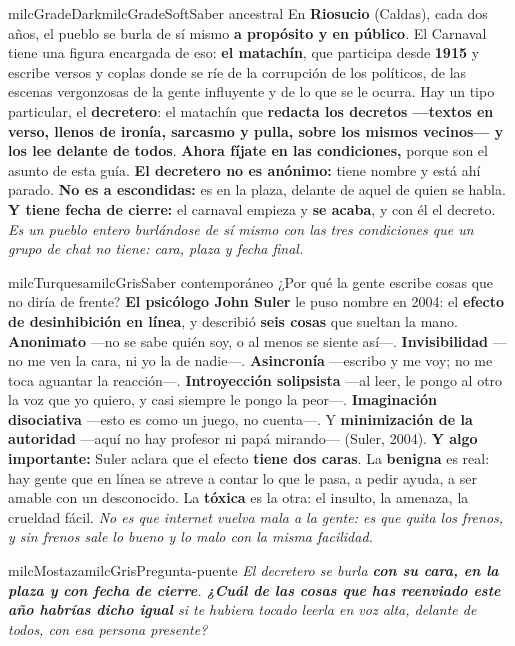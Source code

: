 \documentclass[11pt,letterpaper]{article}
\begin{document}
\begin{softbox}{milcGradeDark}{milcGradeSoft}{Saber ancestral}
En \textbf{Riosucio} (Caldas), cada dos años, el pueblo se burla de sí mismo \textbf{a propósito y en público}. El Carnaval tiene una figura encargada de eso: \textbf{el matachín}, que participa desde \textbf{1915} y escribe versos y coplas donde se ríe de la corrupción de los políticos, de las escenas vergonzosas de la gente influyente y de lo que se le ocurra. Hay un tipo particular, el \textbf{decretero}: el matachín que \textbf{redacta los decretos ---textos en verso, llenos de ironía, sarcasmo y pulla, sobre los mismos vecinos--- y \textbf{los lee delante de todos}}. \textbf{Ahora fíjate en las condiciones,} porque son el asunto de esta guía. \textbf{El decretero no es anónimo:} tiene nombre y está ahí parado. \textbf{No es a escondidas:} es en la plaza, delante de aquel de quien se habla. \textbf{Y tiene fecha de cierre:} el carnaval empieza y \textbf{se acaba}, y con él el decreto. \emph{Es un pueblo entero burlándose de sí mismo con las tres condiciones que un grupo de chat no tiene: cara, plaza y fecha final.}
\end{softbox}

\begin{softbox}{milcTurquesa}{milcGris}{Saber contemporáneo}
¿Por qué la gente escribe cosas que no diría de frente? \textbf{El psicólogo John Suler} le puso nombre en 2004: el \textbf{efecto de desinhibición en línea}, y describió \textbf{seis cosas} que sueltan la mano. \textbf{Anonimato} ---no se sabe quién soy, o al menos se siente así---. \textbf{Invisibilidad} ---no me ven la cara, ni yo la de nadie---. \textbf{Asincronía} ---escribo y me voy; no me toca aguantar la reacción---. \textbf{Introyección solipsista} ---al leer, le pongo al otro la voz que yo quiero, y casi siempre le pongo la peor---. \textbf{Imaginación disociativa} ---esto es como un juego, no cuenta---. Y \textbf{minimización de la autoridad} ---aquí no hay profesor ni papá mirando--- (Suler, 2004). \textbf{Y algo importante:} Suler aclara que el efecto \textbf{tiene dos caras}. La \textbf{benigna} es real: hay gente que en línea se atreve a contar lo que le pasa, a pedir ayuda, a ser amable con un desconocido. La \textbf{tóxica} es la otra: el insulto, la amenaza, la crueldad fácil. \emph{No es que internet vuelva mala a la gente: es que quita los frenos, y sin frenos sale lo bueno y lo malo con la misma facilidad.}
\end{softbox}

\begin{softbox}{milcMostaza}{milcGris}{Pregunta-puente}
\textit{El decretero se burla \textbf{con su cara, en la plaza y con fecha de cierre}. \textbf{¿Cuál de las cosas que has reenviado este año habrías dicho igual} si te hubiera tocado leerla en voz alta, delante de todos, con esa persona presente?}
\end{softbox}
\end{document}
